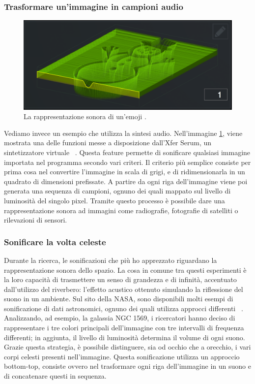 \subsubsection{Trasformare un'immagine in campioni audio}
\begin{figure}[H]
  \includegraphics[width=\linewidth]{img/snowman.png}
  \caption{La rappresentazione sonora di un'emoji \cite{snowman}.}
  \label{fig:emoji_wavetable}
\end{figure}

Vediamo invece un esempio che utilizza la sintesi audio.
Nell'immagine \ref{fig:emoji_wavetable}, viene mostrata una delle funzioni messe a disposizione dall'Xfer Serum, un sintetizzatore virtuale ~\cite{serum}.
Questa feature permette di sonificare qualsiasi immagine importata nel programma secondo vari criteri.
Il criterio più semplice consiste per prima cosa nel convertire l'immagine in scala di grigi, e di ridimensionarla in un quadrato di dimensioni prefissate.
A partire da ogni riga dell'immagine viene poi generata una sequenza di campioni, ognuno dei quali mappato sul livello di luminosità del singolo pixel.
Tramite questo processo è possibile dare una rappresentazione sonora ad immagini come radiografie, fotografie di satelliti o rilevazioni di sensori.

\newpage

\subsubsection{Sonificare la volta celeste}
Durante la ricerca, le sonificazioni che più ho apprezzato riguardano la rappresentazione sonora dello spazio.
La cosa in comune tra questi esperimenti è la loro capacità di trasmettere un senso di grandezza e di infinità, accentuato dall'utilizzo del riverbero: l'effetto acustico ottenuto simulando la riflessione del suono in un ambiente. 
Sul sito della NASA, sono disponibili molti esempi di sonificazione di dati astronomici, ognuno dei quali utilizza approcci differenti ~\cite{nasa}.
Analizzando, ad esempio, la galassia NGC 1569, i ricercatori hanno deciso di rappresentare i tre colori principali dell'immagine con tre intervalli di frequenza differenti; in aggiunta, il livello di luminosità determina il volume di ogni suono.
Grazie questa strategia, è possibile distinguere, sia od occhio che a orecchio, i vari corpi celesti presenti nell'immagine.
Questa sonificazione utilizza un approccio bottom-top, consiste ovvero nel trasformare ogni riga dell'immagine in un suono e di concatenare questi in sequenza. 

